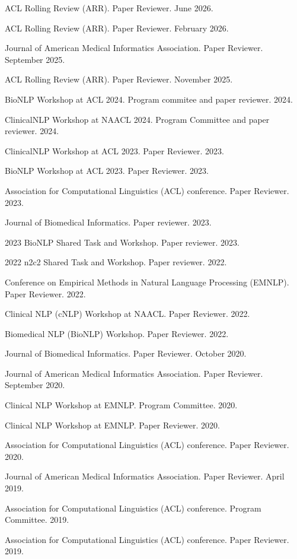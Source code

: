 \documentclass[letterpaper]{article}
\renewenvironment{itemize}{
  \begin{list}{}{
    \setlength{\leftmargin}{1.5em}
  }
}{
  \end{list}
}
\begin{document}
\begin{itemize}
\item ACL Rolling Review (ARR). Paper Reviewer. June 2026.
\item ACL Rolling Review (ARR). Paper Reviewer. February 2026.
\item Journal of American Medical Informatics Association. Paper Reviewer. September 2025.
\item ACL Rolling Review (ARR). Paper Reviewer. November 2025.
\item BioNLP Workshop at ACL 2024. Program commitee and paper reviewer. 2024.
\item ClinicalNLP Workshop at NAACL 2024. Program Committee and paper reviewer. 2024.
\item ClinicalNLP Workshop at ACL 2023. Paper Reviewer. 2023.
\item BioNLP Workshop at ACL 2023. Paper Reviewer. 2023.
\item Association for Computational Linguistics (ACL) conference. Paper Reviewer. 2023.
\item Journal of Biomedical Informatics. Paper reviewer. 2023.
\item 2023 BioNLP Shared Task and Workshop. Paper reviewer. 2023.
\item 2022 n2c2 Shared Task and Workshop. Paper reviewer. 2022.
\item Conference on Empirical Methods in Natural Language Processing (EMNLP). Paper Reviewer. 2022.
\item Clinical NLP (cNLP) Workshop at NAACL. Paper Reviewer. 2022.
\item Biomedical NLP (BioNLP) Workshop. Paper Reviewer. 2022.
\item Journal of Biomedical Informatics. Paper Reviewer. October 2020.
\item Journal of American Medical Informatics Association. Paper Reviewer. September 2020.
\item Clinical NLP Workshop at EMNLP. Program Committee. 2020.
\item Clinical NLP Workshop at EMNLP. Paper Reviewer. 2020.
\item Association for Computational Linguistics (ACL) conference. Paper Reviewer. 2020.
\item Journal of American Medical Informatics Association. Paper Reviewer. April 2019.
\item Association for Computational Linguistics (ACL) conference. Program Committee. 2019.
\item Association for Computational Linguistics (ACL) conference. Paper Reviewer. 2019.

\end{itemize}
\end{document}
